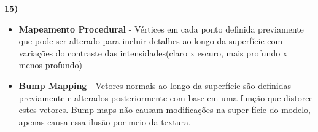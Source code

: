 \textbf{15)} 

\begin{itemize}
    \item \textbf{Mapeamento Procedural} - Vértices em cada ponto definida previamente que pode ser alterado
    para incluir detalhes ao longo da superfície com variações do contraste das intensidades(claro x escuro,
    mais profundo x menos profundo)

    \item \textbf{Bump Mapping} - Vetores normais ao longo da superfície são definidas previamente e alterados 
    posteriormente com base em uma função que distorce estes vetores. Bump maps não causam modificações na super 
    fície do modelo, apenas causa essa ilusão por meio da textura.
\end{itemize}


